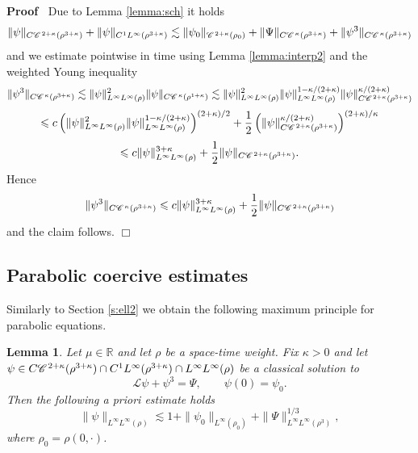 \documentclass[a4paper,11pt]{article}
\renewcommand{\leq}{\leqslant}
\newenvironment{proof}{\noindent\textbf{Proof\ }}{\hspace*{\fill}$\Box$\medskip}
\newtheorem{lemma}[theorem]{Lemma}
\numberwithin{equation}{section}
\newcommand{\CC}{\mathscr{C} \hspace{.1em}}
\newcommand{\LL}{\mathscr{L}}
\newcommand{\R}{\mathbb{R}}
\newcommand{\8}{\infty}
\begin{document}
\begin{proof}
Due to Lemma \ref{lemma:sch} it holds
$$
\|\psi\|_{C\CC^{2+\kappa}(\rho^{3+\kappa})}+\|\psi\|_{C^{1}L^{\infty}(\rho^{3+\kappa})}\lesssim\|\psi_{0}\|_{\CC^{2+\kappa}(\rho_{0})}+  \|\Psi\|_{C\CC^\kappa(\rho^{3+\kappa})}+\|\psi^3\|_{C\CC^\kappa(\rho^{3+\kappa})}
$$
 and we estimate  pointwise in time using Lemma \ref{lemma:interp2} and the weighted Young inequality
  \[ \| \psi^3 \|_{C\CC^{\kappa} (\rho^{3 + \kappa})} \lesssim \| \psi
     \|_{L^{\infty}L^{\infty} (\rho)}^2 \| \psi \|_{C\CC^{\kappa} (\rho^{1 + \kappa})}\lesssim \| \psi
     \|_{L^{\infty}L^{\infty} (\rho)}^2 \| \psi \|_{L^{\infty}L^{\infty} (\rho)}^{1 - \kappa / (2
     + \kappa)} \| \psi \|_{C\CC^{2 + \kappa} (\rho^{3 + \kappa})}^{\kappa / (2
     + \kappa)}
    \]
    $$
    \leq
    c\left( \|\psi\|_{L^{\infty}L^{\infty} (\rho)}^2 \| \psi \|_{L^{\infty}L^{\infty} (\rho)}^{1 - \kappa / (2
     + \kappa)}\right)^{(2 + \kappa) / 2} + \frac{1}{2}\left( \| \psi \|_{C\CC^{2 +
     \kappa} (\rho^{3 + \kappa})}^{\kappa / (2 + \kappa)} \right)^{(2 +
     \kappa) / \kappa}
    $$
    $$ \leqslant c\| \psi
     \|_{L^{\infty} L^{\infty}(\rho)}^{3 + \kappa} +
     \frac{1}{2} \| \psi \|_{C\CC^{2 + \kappa} (\rho^{3 + \kappa})} .
    $$
    Hence
    $$
     \| \psi^3 \|_{C\CC^{\kappa} (\rho^{3 + \kappa})} \leqslant c\| \psi
     \|_{L^{\infty}L^{\infty} (\rho)}^{3 + \kappa} +
     \frac{1}{2} \| \psi \|_{C\CC^{2 + \kappa} (\rho^{3 + \kappa})} 
    $$
and the claim follows.
\end{proof}




\subsection{Parabolic coercive estimates}

Similarly to Section \ref{s:ell2} we obtain the following maximum principle for parabolic equations.


\begin{lemma}
  \label{lemma:apriori-parabolic}
 Let $\mu\in\R$ and let $\rho$ be a  space-time weight. Fix $\kappa > 0$ and let $\psi \in C\CC^{2+\kappa}(\rho^{3+\kappa})\cap C^{1}L^{\infty}(\rho^{3+\kappa})\cap L^{\infty}L^{\infty}(\rho)$ be a classical
  solution to
  \[\LL  \psi + \psi^3 = \Psi,\qquad \psi(0)=\psi_{0} .\]
 Then the following a priori estimate holds
  \[ \| \psi  \|_{L^{\infty}L^{\infty} (\rho)} \lesssim 1+ \|\psi_{0}\|_{L^{\infty}(\rho_{0})}+ \|\Psi\|^{1/3}_{L^{\infty}L^{\infty}(\rho^{3})},
  \]
  where $\rho_{0}=\rho(0,\cdot)$.
\end{lemma}
\end{document}
